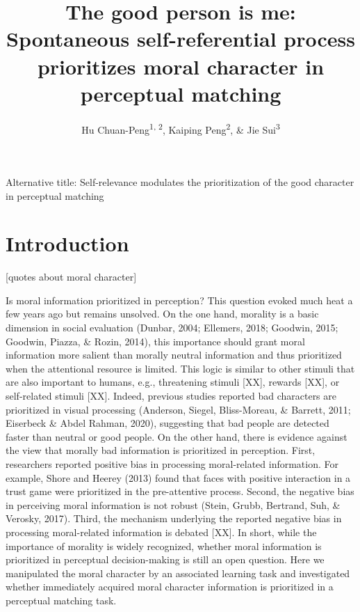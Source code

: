 \documentclass[
  man]{apa6}
\title{The good person is me: Spontaneous self-referential process prioritizes moral character in perceptual matching}
\author{Hu Chuan-Peng\textsuperscript{1, 2}, Kaiping Peng\textsuperscript{2}, \& Jie Sui\textsuperscript{3}}
\date{}
\affiliation{\vspace{0.5cm}\textsuperscript{1} Nanjing Normal University, 210024 Nanjing, China\\\textsuperscript{2} Tsinghua University, 100084 Beijing, China\\\textsuperscript{3} University of Aberdeen, Aberdeen, Scotland}
\begin{document}
\maketitle

Alternative title: Self-relevance modulates the prioritization of the good character in perceptual matching

\hypertarget{introduction}{%
\section{Introduction}\label{introduction}}

{[}quotes about moral character{]}

Is moral information prioritized in perception? This question evoked much heat a few years ago but remains unsolved. On the one hand, morality is a basic dimension in social evaluation (Dunbar, 2004; Ellemers, 2018; Goodwin, 2015; Goodwin, Piazza, \& Rozin, 2014), this importance should grant moral information more salient than morally neutral information and thus prioritized when the attentional resource is limited. This logic is similar to other stimuli that are also important to humans, e.g., threatening stimuli {[}XX{]}, rewards {[}XX{]}, or self-related stimuli {[}XX{]}. Indeed, previous studies reported bad characters are prioritized in visual processing (Anderson, Siegel, Bliss-Moreau, \& Barrett, 2011; Eiserbeck \& Abdel Rahman, 2020), suggesting that bad people are detected faster than neutral or good people. On the other hand, there is evidence against the view that morally bad information is prioritized in perception. First, researchers reported positive bias in processing moral-related information. For example, Shore and Heerey (2013) found that faces with positive interaction in a trust game were prioritized in the pre-attentive process. Second, the negative bias in perceiving moral information is not robust (Stein, Grubb, Bertrand, Suh, \& Verosky, 2017). Third, the mechanism underlying the reported negative bias in processing moral-related information is debated {[}XX{]}. In short, while the importance of morality is widely recognized, whether moral information is prioritized in perceptual decision-making is still an open question. Here we manipulated the moral character by an associated learning task and investigated whether immediately acquired moral character information is prioritized in a perceptual matching task.
\end{document}
